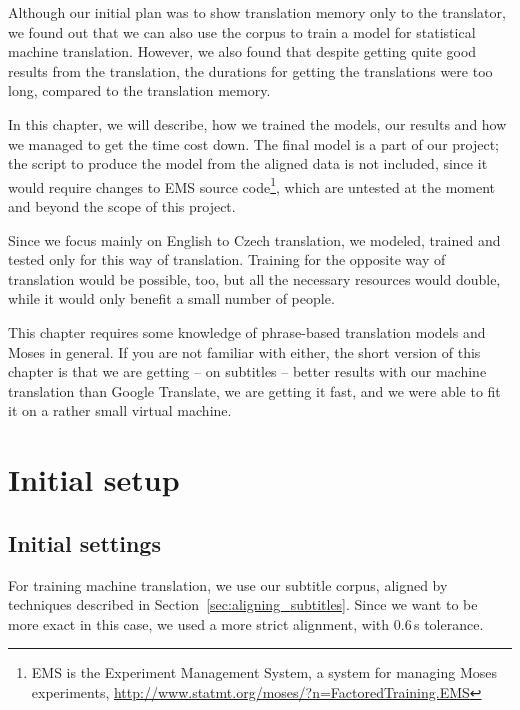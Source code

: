 \label{chap:moses}


Although our initial plan was to show translation memory only to the translator, we found out that we can also use the corpus to train a model for statistical machine translation. However, we also found that despite getting quite good results from the translation, the durations for getting the translations were too long, compared to the translation memory.

In this chapter, we will describe, how we trained the models, our results and how we managed to get the time cost down. The final model is a part of our project; the script to produce the model from the aligned data is not included, since it would require changes to EMS source code\footnote{EMS is the Experiment Management System, a system for managing Moses experiments, \url{http://www.statmt.org/moses/?n=FactoredTraining.EMS}}, which are untested at the moment and beyond the scope of this project.

Since we focus mainly on English to Czech translation, we modeled, trained and tested only for this way of translation. Training for the opposite way of translation would be possible, too, but all the necessary resources would double, while it would only benefit a small number of people.

This chapter requires some knowledge of phrase-based translation models and Moses in general. If you are not familiar with either, the short version of this chapter is that we are getting -- on subtitles -- better results with our machine translation than Google Translate, we are getting it fast, and we were able to fit it on a rather small virtual machine.


\section{Initial setup}
\subsection{Initial settings}

For training machine translation, we use our subtitle corpus, aligned by techniques described in Section~\ref{sec:aligning_subtitles}. Since we want to be more exact in this case, we used a more strict alignment, with 0.6\,s tolerance.


